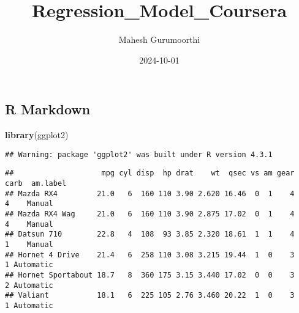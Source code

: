 \documentclass[
]{article}
\title{Regression\_Model\_Coursera}
\author{Mahesh Gurumoorthi}
\date{2024-10-01}
\newenvironment{Shaded}{\begin{snugshade}}{\end{snugshade}}
\newcommand{\AttributeTok}[1]{\textcolor[rgb]{0.13,0.29,0.53}{#1}}
\newcommand{\CommentTok}[1]{\textcolor[rgb]{0.56,0.35,0.01}{\textit{#1}}}
\newcommand{\FunctionTok}[1]{\textcolor[rgb]{0.13,0.29,0.53}{\textbf{#1}}}
\newcommand{\NormalTok}[1]{#1}
\newcommand{\OtherTok}[1]{\textcolor[rgb]{0.56,0.35,0.01}{#1}}
\newcommand{\SpecialCharTok}[1]{\textcolor[rgb]{0.81,0.36,0.00}{\textbf{#1}}}
\newcommand{\StringTok}[1]{\textcolor[rgb]{0.31,0.60,0.02}{#1}}
\begin{document}
\maketitle

\subsection{R Markdown}\label{r-markdown}

\begin{Shaded}
\begin{Highlighting}[]
\FunctionTok{library}\NormalTok{(ggplot2)}
\end{Highlighting}
\end{Shaded}

\begin{verbatim}
## Warning: package 'ggplot2' was built under R version 4.3.1
\end{verbatim}

\begin{Shaded}
\end{Shaded}

\begin{verbatim}
##                    mpg cyl disp  hp drat    wt  qsec vs am gear carb  am.label
## Mazda RX4         21.0   6  160 110 3.90 2.620 16.46  0  1    4    4    Manual
## Mazda RX4 Wag     21.0   6  160 110 3.90 2.875 17.02  0  1    4    4    Manual
## Datsun 710        22.8   4  108  93 3.85 2.320 18.61  1  1    4    1    Manual
## Hornet 4 Drive    21.4   6  258 110 3.08 3.215 19.44  1  0    3    1 Automatic
## Hornet Sportabout 18.7   8  360 175 3.15 3.440 17.02  0  0    3    2 Automatic
## Valiant           18.1   6  225 105 2.76 3.460 20.22  1  0    3    1 Automatic
\end{verbatim}
\end{document}
